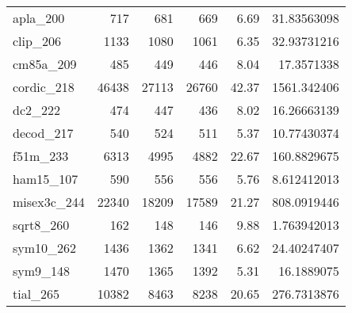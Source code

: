 \begin{table}[tbp]
\begin{tabular}{l|r|r|r|r|r}
      apla\_200                      &717                       &681                        &669                        &6.69                                &31.83563098              \\
      clip\_206                      &1133                      &1080                       &1061                       &6.35                                &32.93731216              \\
      cm85a\_209                     &485                       &449                        &446                        &8.04                                &17.3571338              \\
      cordic\_218                    &46438                     &27113                      &26760                      &42.37                               &1561.342406              \\
      dc2\_222                       &474                       &447                        &436                        &8.02                                &16.26663139              \\
      decod\_217                     &540                       &524                        &511                        &5.37                                &10.77430374              \\
      f51m\_233                      &6313                      &4995                       &4882                       &22.67                               &160.8829675              \\
      ham15\_107                     &590                       &556                        &556                        &5.76                                &8.612412013              \\
      misex3c\_244                   &22340                     &18209                      &17589                      &21.27                               &808.0919446              \\
      sqrt8\_260                     &162                       &148                        &146                        &9.88                                &1.763942013              \\
      sym10\_262                     &1436                      &1362                       &1341                       &6.62                                &24.40247407              \\
      sym9\_148                      &1470                      &1365                       &1392                       &5.31                                &16.1889075              \\
      tial\_265                      &10382                     &8463                       &8238                       &20.65                               &276.7313876              \\ \hline
  \end{tabular}
\end{table}

